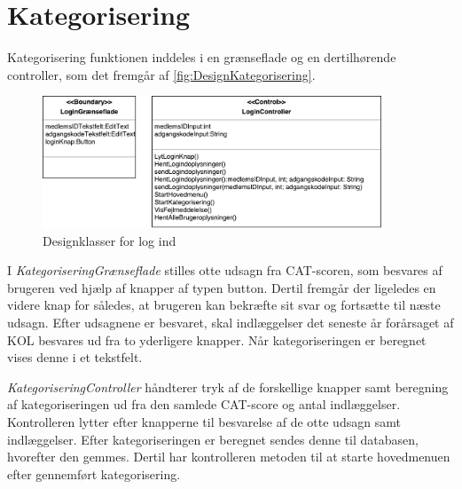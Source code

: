 \section{Kategorisering}
Kategorisering funktionen inddeles i en grænseflade og en dertilhørende controller, som det fremgår af \autoref{fig:DesignKategorisering}.

\begin{figure} [H]
\centering
\includegraphics[width=0.9\textwidth]{figures/MVC/MVCLogInd}
\caption{Designklasser for log ind}
\label{fig:DesignKategorisering}
\end{figure}

I \textit{KategoriseringGrænseflade} stilles otte udsagn fra CAT-scoren, som besvares af brugeren ved hjælp af knapper af typen button. Dertil fremgår der ligeledes en videre knap for således, at brugeren kan bekræfte sit svar og fortsætte til næste udsagn. Efter udsagnene er besvaret, skal indlæggelser det seneste år forårsaget af KOL besvares ud fra to yderligere knapper. Når kategoriseringen er beregnet vises denne i et tekstfelt. 

\textit{KategoriseringController} håndterer tryk af de forskellige knapper samt beregning af kategoriseringen ud fra den samlede CAT-score og antal indlæggelser. Kontrolleren lytter efter knapperne til besvarelse af de otte udsagn samt indlæggelser. Efter kategoriseringen er beregnet sendes denne til databasen, hvorefter den gemmes. Dertil har kontrolleren metoden til at starte hovedmenuen efter gennemført kategorisering.  